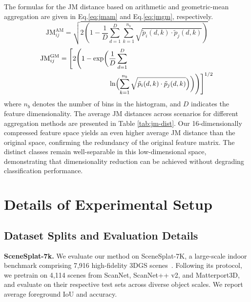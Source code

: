 The formulas for the JM distance based on arithmetic and geometric-mean aggregation are given in Eq.\eqref{eq:jmam} and Eq.\eqref{eq:jmgm}, respectively.
\begin{equation}
    \text{JM}_{ij}^{\text{AM}} = \sqrt{2 \left(1 - \frac{1}{D} \sum_{d=1}^{D} \sum_{k=1}^{n_{b}} \sqrt{\tilde{p}_i(d,k) \cdot \tilde{p}_j(d,k)}\right)} 
    \label{eq:jmam}
\end{equation}
\begin{equation}
    \begin{aligned} \text{JM}_{ij}^{\text{GM}} = \Biggl[2 \Biggl(1 - \exp\biggl(&\frac{1}{D} \sum_{d=1}^{D} \\ &\ln\Bigl(\sum_{k=1}^{n_b} \sqrt{\tilde{p}_i(d,k) \cdot \tilde{p}_j(d,k)}\Bigr)\biggr)\Biggr)\Biggr]^{1/2} \end{aligned}
    \label{eq:jmgm}
\end{equation}
where $n_b$ denotes the number of bins in the histogram, and $D$ indicates the feature dimensionality. 
The average JM distances across scenarios for different aggregation methods are presented in Table \ref{tab:jm-dist}. Our 16-dimensionally compressed feature space yields an even higher average JM distance than the original space, confirming the redundancy of the original feature matrix. The distinct classes remain well-separable in this low-dimensional space, demonstrating that dimensionality reduction can be achieved without degrading classification performance.


\section{Details of Experimental Setup}
\label{sec:exp_details}

\subsection{Dataset Splits and Evaluation Details}

\noindent\textbf{SceneSplat-7k.} We evaluate our method on SceneSplat-7K, a large-scale indoor benchmark comprising 7,916 high-fidelity 3DGS scenes~\cite{dai2017scannet, yeshwanth2023scannet++, straub2019replica, roberts2021hypersim, wald20193rscan, dehghan2021arkitscenes, chang2017matterport3d}. Following its protocol, we pretrain on 4,114 scenes from ScanNet, ScanNet++ v2, and Matterport3D, and evaluate on their respective test sets across diverse object scales. We report average foreground IoU and accuracy.

